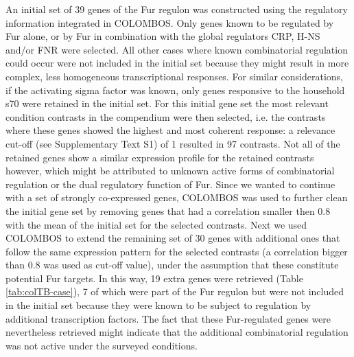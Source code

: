 An initial set of 39 genes of the Fur regulon was constructed using the  regulatory information integrated in COLOMBOS. Only genes known to be regulated  by Fur alone, or by Fur in combination with the global regulators CRP, H-NS  and/or FNR were selected. All other cases where known combinatorial regulation  could occur were not included in the initial set because they might result in  more complex, less homogeneous transcriptional responses. For similar  considerations, if the activating sigma factor was known, only genes responsive  to the household s70 were retained in the initial set. For this initial gene  set the most relevant condition contrasts in the compendium were then selected,  i.e. the contrasts where these genes showed the highest and most coherent  response: a relevance cut-off (see Supplementary Text S1) of 1 resulted in 97  contrasts. Not all of the retained genes show a similar expression profile for  the retained contrasts however, which might be attributed to unknown active  forms of combinatorial regulation or the dual regulatory function of Fur. Since  we wanted to continue with a set of strongly co-expressed genes, COLOMBOS was  used to further clean the initial gene set by removing genes that had a  correlation smaller then 0.8 with the mean of the initial set for the selected  contrasts. Next we used COLOMBOS to extend the remaining set of 30 genes with  additional ones that follow the same expression pattern for the selected  contrasts (a correlation bigger than 0.8 was used as cut-off value), under the  assumption that these constitute potential Fur targets. In this way, 19 extra  genes were retrieved (Table \ref{tab:colTB-case}), 7 of which were part of the  Fur regulon but were not included in the initial set because they were known to  be subject to regulation by additional transcription factors. The fact that  these Fur-regulated genes were nevertheless retrieved might indicate that the  additional combinatorial regulation was not active under the surveyed  conditions.


